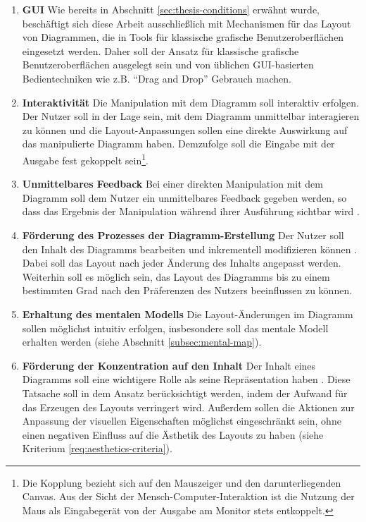 \begin{enumerate}[label={K.\arabic*}]

\item
\label{req:gui}
\textbf{GUI}
Wie bereits in Abschnitt \ref{sec:thesis-conditions} erwähnt wurde, beschäftigt sich diese Arbeit ausschließlich mit Mechanismen für das Layout von Diagrammen, die in Tools für klassische grafische Benutzeroberflächen eingesetzt werden. Daher soll der Ansatz für klassische grafische Benutzeroberflächen ausgelegt sein und von üblichen GUI-basierten Bedientechniken wie z.B. \enquote{Drag and Drop} Gebrauch machen.

\item
\label{req:interactivity}
\textbf{Interaktivität}
Die Manipulation mit dem Diagramm soll interaktiv erfolgen. Der Nutzer soll in der Lage sein, mit dem Diagramm unmittelbar interagieren zu können und die Layout-Anpassungen sollen eine direkte Auswirkung auf das manipulierte Diagramm haben. Demzufolge soll die Eingabe mit der Ausgabe fest gekoppelt sein\footnote{Die Kopplung bezieht sich auf den Mauszeiger und den darunterliegenden Canvas. Aus der Sicht der Mensch-Computer-Interaktion ist die Nutzung der Maus als Eingabegerät von der Ausgabe am Monitor stets entkoppelt.}.

\item
\label{req:immediate-feedback}
\textbf{Unmittelbares Feedback}
Bei einer direkten Manipulation mit dem Diagramm soll dem Nutzer ein unmittelbares Feedback gegeben werden, so dass das Ergebnis der Manipulation während ihrer Ausführung sichtbar wird \cite[S.69]{Wybrow08Using}.

\item
\label{req:editing-support}
\textbf{Förderung des Prozesses der Diagramm-Erstellung}
Der Nutzer soll den Inhalt des Diagramms bearbeiten und inkrementell modifizieren können \cite{GladischSchumann14Semi-Automatic}. Dabei soll das Layout nach jeder Änderung des Inhalts angepasst werden. Weiterhin soll es möglich sein, das Layout des Diagramms bis zu einem bestimmten Grad nach den Präferenzen des Nutzers beeinflussen zu können.

\item
\label{req:mental-map}
\textbf{Erhaltung des mentalen Modells}
Die Layout-Änderungen im Diagramm sollen möglichst intuitiv erfolgen, insbesondere soll das mentale Modell erhalten werden (siehe Abschnitt \ref{subsec:mental-map}).


\item
\label{req:focus-on-the-content}
\textbf{Förderung der Konzentration auf den Inhalt}
Der Inhalt eines Diagramms soll eine wichtigere Rolle als seine Repräsentation haben \cite[S.38ff]{Ambler02Agile}. Diese Tatsache soll in dem Ansatz berücksichtigt werden, indem der Aufwand für das Erzeugen des Layouts verringert wird. Außerdem sollen die Aktionen zur Anpassung der visuellen Eigenschaften möglichst eingeschränkt sein, ohne einen negativen Einfluss auf die Ästhetik des Layouts zu haben (siehe Kriterium \ref{req:aesthetics-criteria}).


\end{enumerate}
